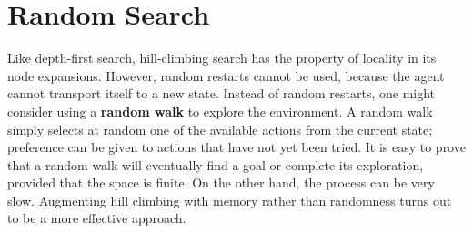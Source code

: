 \section{Random Search}
Like depth-first search, hill-climbing search has the property of locality in its node expansions. However, random restarts cannot be used, because the agent cannot transport itself to a new state. Instead of random restarts, one might consider using a \textbf{random walk} to explore the environment. A random walk simply selects at random one of the available actions from the current state; preference can be given to actions that have not yet been tried. It is easy to prove that a random walk will eventually find a goal or complete its exploration, provided that the space is finite. On the other hand, the process can be very slow. Augmenting hill climbing with memory rather than randomness turns out to be a more effective approach.

